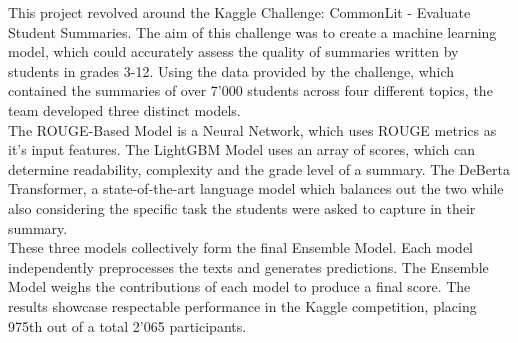\noindent
This project revolved around the Kaggle Challenge: CommonLit - Evaluate Student Summaries. The aim of this challenge was to create a machine learning model, which could accurately assess the quality of summaries written by students in grades 3-12. Using the data provided by the challenge, which contained the summaries of over 7'000 students across four different topics, the team developed three distinct models.\\
The ROUGE-Based Model is a Neural Network, which uses ROUGE metrics as it’s input features. The LightGBM Model uses an array of scores, which can determine readability, complexity and the grade level of a summary. The DeBerta Transformer, a state-of-the-art language model which balances out the two while also considering the specific task the students were asked to capture in their summary.\\
These three models collectively form the final Ensemble Model. Each model independently preprocesses the texts and generates predictions. The Ensemble Model weighs the contributions of each model to produce a final score. The results showcase respectable performance in the Kaggle competition, placing 975th out of a total 2'065 participants.